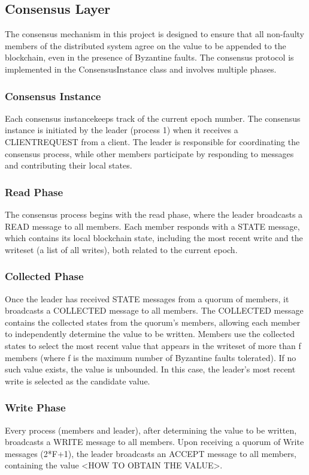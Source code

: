 \documentclass[runningheads]{llncs}
\begin{document}
%
\subsection{Consensus Layer}
The consensus mechanism in this project is designed to ensure that all
non-faulty members of the distributed system agree on the value to be appended
to the blockchain, even in the presence of Byzantine faults. The consensus
protocol is implemented in the ConsensusInstance class and involves multiple
phases.
\subsubsection{Consensus Instance}
Each consensus instancekeeps track of the current epoch number. 
The consensus instance is initiated by the leader
(process 1) when it receives a CLIENTREQUEST from a client. The leader is
responsible for coordinating the consensus process, while other members
participate by responding to messages and contributing their local states.
\subsubsection{Read Phase}
The consensus process begins with the read phase, where the leader broadcasts a
READ message to all members. Each member responds with a STATE message, which
contains its local blockchain state, including the most recent write and the
writeset (a list of all writes), both related to the current epoch.

\subsubsection{Collected Phase}
Once the leader has received STATE messages from a quorum of members, it
broadcasts a COLLECTED message to all members. The COLLECTED message contains
the collected states from the quorum's members, allowing each member to independently
determine the value to be written. Members use the collected states to select
the most recent value that appears in the writeset of more than f members (where
f is the maximum number of Byzantine faults tolerated). If no such value exists,
the value is unbounded. In this case, the leader's most recent write is selected 
as the candidate value.
\subsubsection{Write Phase}
Every process (members and leader), after determining the value to be written,
broadcasts a WRITE message to all members. Upon receiving a quorum of Write messages (2*F+1),
the leader broadcasts an ACCEPT message to all members, containing the value <HOW TO OBTAIN THE VALUE>.
\end{document}
